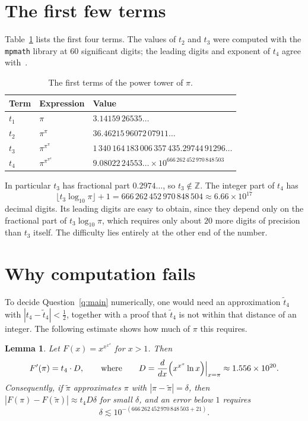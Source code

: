 \documentclass[11pt]{amsart}
\newtheorem{lemma}[theorem]{Lemma}
\theoremstyle{definition}
\theoremstyle{remark}
\begin{document}
\section{The first few terms}\label{sec:values}

Table~\ref{tab:values} lists the first four terms. The values of $t_2$ and $t_3$ were computed with the \texttt{mpmath} library at $60$ significant digits; the leading digits and exponent of $t_4$ agree with~\cite{oeis}.

\begin{table}[h]
\centering
\renewcommand{\arraystretch}{1.25}
\begin{tabular}{lll}
\hline
Term & Expression & Value \\
\hline
$t_1$ & $\pi$ & $3.14159\,26535\ldots$ \\
$t_2$ & $\pi^{\pi}$ & $36.46215\,96072\,07911\ldots$ \\
$t_3$ & $\pi^{\pi^{\pi}}$ & $1\,340\,164\,183\,006\,357\,435.29744\,91296\ldots$ \\
$t_4$ & $\pi^{\pi^{\pi^{\pi}}}$ & $9.08022\,24553\ldots \times 10^{666\,262\,452\,970\,848\,503}$ \\
\hline
\end{tabular}
\caption{The first terms of the power tower of $\pi$.}
\label{tab:values}
\end{table}

In particular $t_3$ has fractional part $0.2974\ldots$, so $t_3 \notin \mathbb{Z}$. The integer part of $t_4$ has
\[
\lfloor t_3 \log_{10}\pi \rfloor + 1 = 666\,262\,452\,970\,848\,504 \approx 6.66 \times 10^{17}
\]
decimal digits. Its leading digits are easy to obtain, since they depend only on the fractional part of $t_3\log_{10}\pi$, which requires only about $20$ more digits of precision than $t_3$ itself. The difficulty lies entirely at the other end of the number.

\section{Why computation fails}\label{sec:computation}

To decide Question~\ref{q:main} numerically, one would need an approximation $\tilde t_4$ with $|t_4 - \tilde t_4| < \tfrac12$, together with a proof that $\tilde t_4$ is not within that distance of an integer. The following estimate shows how much of $\pi$ this requires.

\begin{lemma}\label{lem:sensitivity}
Let $F(x) = x^{x^{x^{x}}}$ for $x > 1$. Then
\[
F'(\pi) = t_4 \cdot D, \qquad\text{where}\qquad D = \frac{d}{dx}\Bigl(x^{x^{x}} \ln x\Bigr)\Big|_{x=\pi} \approx 1.556 \times 10^{20}.
\]
Consequently, if $\tilde\pi$ approximates $\pi$ with $|\pi - \tilde\pi| = \delta$, then $|F(\pi) - F(\tilde\pi)| \approx t_4 D \delta$ for small $\delta$, and an error below $1$ requires
\[
\delta \lesssim 10^{-(666\,262\,452\,970\,848\,503 + 21)}.
\]
\end{lemma}
\end{document}
